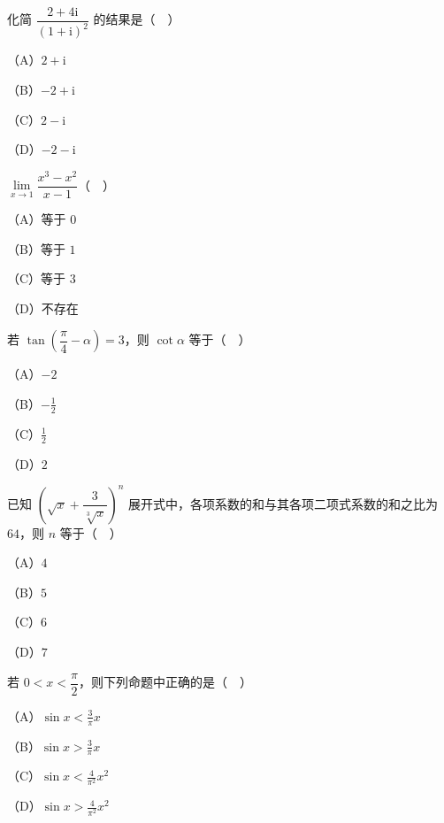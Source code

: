 


\begin{question}
化简 $\dfrac{2+4\mathrm i}{(1+\mathrm i)^2}$ 的结果是（　）

（A）$2+\mathrm i$

（B）$-2+\mathrm i$

（C）$2-\mathrm i$

（D）$-2-\mathrm i$

\end{question}
\begin{question}
$\lim\limits_{x\to1}\dfrac{x^3-x^2}{x-1}$（　）

（A）等于 $0$

（B）等于 $1$

（C）等于 $3$

（D）不存在

\end{question}
\begin{question}
若 $\tan\left(\dfrac{\pi}{4}-\alpha\right)=3$，则 $\cot\alpha$ 等于（　）

（A）$-2$

（B）$-\frac12$

（C）$\frac12$

（D）$2$

\end{question}
\begin{question}
已知 $\left(\sqrt x+\dfrac{3}{\sqrt[3]{x}}\right)^n$ 展开式中，各项系数的和与其各项二项式系数的和之比为 $64$，则 $n$ 等于（　）

（A）$4$

（B）$5$

（C）$6$

（D）$7$

\end{question}
\begin{question}
若 $0<x<\dfrac{\pi}{2}$，则下列命题中正确的是（　）

（A）$\sin x<\frac3\pi x$

（B）$\sin x>\frac3\pi x$

（C）$\sin x<\frac4{\pi^2}x^2$

（D）$\sin x>\frac4{\pi^2}x^2$

\end{question}
